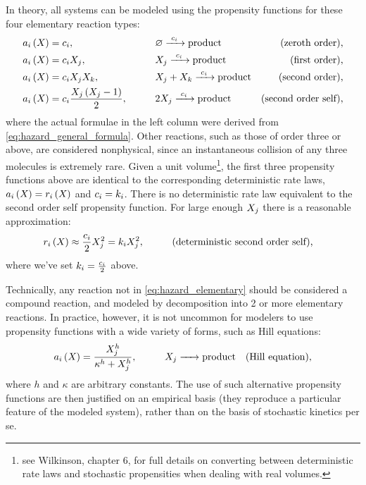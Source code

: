 In theory, all systems can be modeled using the propensity functions for these four elementary reaction types:
\begin{equation}\label{eq:hazard_elementary}
    \begin{aligned}
        \haz &= \constoch, &\qquad & \varnothing \ce{->[\constoch]} \textrm{product} & \textrm{(zeroth order),} \\
%
        \haz &= \constoch \sps, &\qquad & \sps \ce{->[\constoch]} \textrm{product} & \textrm{(first order),} \\
%
        \haz &= \constoch \spsx{\spsi} \spsx{\spsj}, &\qquad & \spsx{\spsi} + \spsx{\spsj} \ce{->[\constoch]} \textrm{product} & \textrm{(second order),} \\
%
        \haz &= \constoch \frac{\sps \left( \sps - 1 \right)}{2}, &\qquad & 2 \sps \ce{->[\constoch]} \textrm{product} & \textrm{(second order self),}
    \end{aligned}
\end{equation}
where the actual formulae in the left column were derived from \eqref{eq:hazard_general_formula}. Other reactions, such as those of order three or above, are considered nonphysical, since an instantaneous collision of any three molecules is extremely rare. Given a unit volume\footnote{see Wilkinson\cite{Wilkinson:2012tt}, chapter 6, for full details on converting between deterministic rate laws and stochastic propensities when dealing with real volumes.}, the first three propensity functions above are identical to the corresponding deterministic rate laws, \ie $a_{i} \left( X_{} \right) = r_{i} \left( X_{} \right)$ and $c_{i} = k_{i}$. There is no deterministic rate law equivalent to the second order self propensity function. For large enough $X_{j}$ there is a reasonable approximation:
\begin{equation}\label{eq:deterministic_second_order_self}
    \begin{aligned}
        r_{i} \left( X_{} \right) \approx  \frac{c_{i}}{2} X_{j}^{2} = k_{i} X_{j}^{2}, &\qquad && \textrm{(deterministic second order self),}
    \end{aligned}
\end{equation}
where we've set $k_{i} = \frac{c_{i}}{2}$ above.

Technically, any reaction not in \eqref{eq:hazard_elementary} should be considered a compound reaction, and modeled by decomposition into 2 or more elementary reactions. In practice, however, it is not uncommon for modelers to use propensity functions with a wide variety of forms, such as Hill equations:
 \begin{equation*}
     \begin{aligned}
        \haz = \frac{\sps^{h}}{\kappa^{h} + \sps^h}, &\qquad & \sps \ce{->} \textrm{product} && \textrm{(Hill equation),} \\
    \end{aligned}
 \end{equation*}
 where $h$ and $\kappa$ are arbitrary constants. The use of such alternative propensity functions are then justified on an empirical basis (\eg they reproduce a particular feature of the modeled system), rather than on the basis of stochastic kinetics per se\cite{Gillespie:1992wf}.

